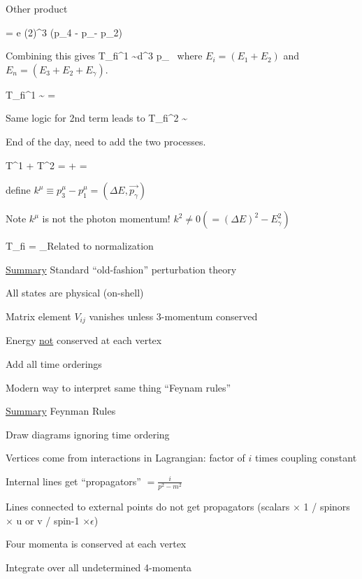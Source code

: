 {Other product

\be
{} = e (2\pi)^3 \delta(p_4 -  p_\gamma - p_2)
\ee

Combining this gives
\be
T_{fi}^1 \sim \int d^3 p_\gamma\  \delta \delta  {}
\ee
where $E_i = (E_1 + E_2)$ and $E_n = (E_3 + E_2 + E_\gamma)$.


\be
T_{fi}^1 \sim   {} = 
\ee

Same logic for 2nd term leads to
\be
T_{fi}^2 \sim  {}
\ee


End of the day, need to add the two processes.




\be
T^{1} + T^{2} =  +  = 
\ee

define $k^\mu \equiv p_3^\mu - p_1^\mu = (\Delta E, \vec{p_\gamma})$

Note $k^\mu$ is not the photon momentum!  $k^2 \ne 0  (= (\Delta E)^2 - E_\gamma^2)$

\be
T_{fi} = _{\textrm{Related to normalization}} 
\ee

\underline{Summary} Standard ``old-fashion'' perturbation theory
\bi
\item[-] All states are physical (on-shell)
\item[-] Matrix element $V_{ij}$ vanishes unless 3-momentum conserved
\item[-] Energy \underline{not} conserved at each vertex
\item[-] Add all time orderings
\ei


Modern way to interpret same thing ``Feynam rules'' 

\underline{Summary} Feynman Rules
\bi
\item[-] Draw diagrams ignoring time ordering
\item[-] Vertices come from interactions in Lagrangian: factor of $i$ times coupling constant
\item[-] Internal lines get ``propagators'' $= \frac{i}{p^2 - m^2}$
\item[-] Lines connected to external points do not get propagators (scalars $\times$ 1 / spinors $\times$ u or v / spin-1 $\times \epsilon$)
\item[-] Four momenta is conserved at each vertex
\item[-] Integrate over all undetermined 4-momenta
\ei

}
